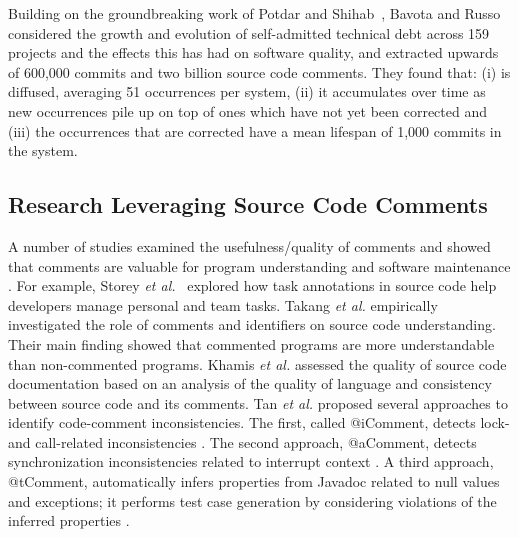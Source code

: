 Building on the groundbreaking work of Potdar and Shihab~\cite{ICSM_PotdarS14}, Bavota and Russo~\cite{bavota2016large} considered the growth and evolution of self-admitted technical debt across 159 projects and the effects this has had on software quality, and extracted upwards of 600,000 commits and two billion source code comments. They found that: (i) \SATD is diffused, averaging 51 occurrences per system, (ii) it accumulates over time as new occurrences pile up on top of ones which have not yet been corrected and (iii) the occurrences that are corrected have a mean lifespan of 1,000 commits in the system.


\subsection{Research Leveraging Source Code Comments}


A number of studies examined the usefulness/quality of comments and showed that comments are valuable for program understanding and software maintenance \cite{TakangGM96,tan07icomment,lawrie2006leveraged}. For example, Storey \emph{et al.}~\cite{Storey:2008} explored how task annotations in source code help developers manage personal and team tasks. Takang {\em et al.} \cite{TakangGM96} empirically investigated the role of comments and identifiers on source code understanding. Their main finding showed that commented programs are more understandable than non-commented programs. Khamis {\em et al.} \cite{Khamis:2010} assessed the quality of source code documentation based on an analysis of the quality of language and consistency between source code and its comments. Tan {\em et al.} proposed several approaches to identify code-comment inconsistencies. The first, called @iComment, detects lock- and call-related inconsistencies \cite{tan07icomment}. The second approach, @aComment, detects synchronization inconsistencies related to interrupt context \cite{acomment}. A third approach, @tComment, automatically infers properties from Javadoc related to null values and exceptions; it performs test case generation by considering violations of the inferred properties \cite{tcomment}.\\

